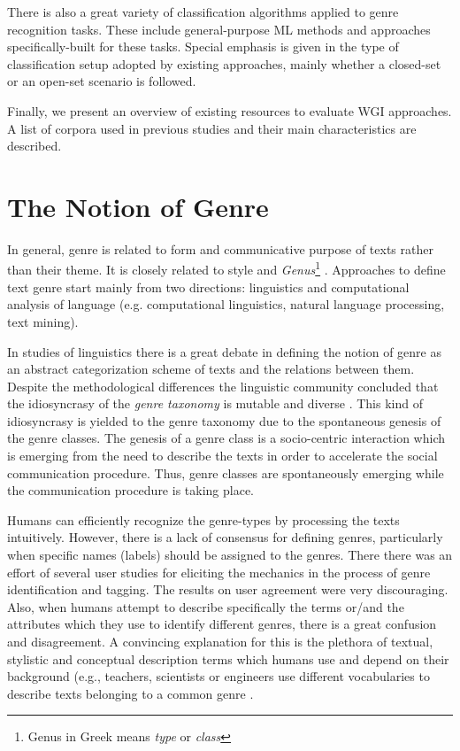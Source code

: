 There is also a great variety of classification algorithms applied to genre recognition tasks. These include general-purpose ML methods and approaches specifically-built for these tasks. Special emphasis is given in the type of classification setup adopted by existing approaches, mainly whether a closed-set or an open-set scenario is followed.

Finally, we present an overview of existing resources to evaluate WGI approaches. A list of corpora used in previous studies and their main characteristics are described. 

\section{The Notion of Genre}
\label{chap:relevant_work:sec:definitions}

In general, genre is related to form and communicative purpose of texts rather than their theme. It is closely related to style and \textit{Genus}\footnote{Genus in Greek means \textit{type} or \textit{class}} \parencite{sugiyanto2014term}. Approaches to define text genre start mainly from two directions: linguistics and computational analysis of language (e.g. computational linguistics, natural language processing, text mining). 

In studies of linguistics there is a great debate in defining the notion of genre as an abstract categorization scheme of texts and the relations between them. Despite the methodological differences the linguistic community concluded that the idiosyncrasy of the \textit{genre taxonomy} is mutable and diverse \parencite{coutinho2009describe}. This kind of idiosyncrasy is yielded to the genre taxonomy due to the spontaneous genesis of the genre classes. The genesis of a genre class is a socio-centric interaction which is emerging from the need to describe the texts in order to accelerate the social communication procedure. Thus, genre classes are spontaneously emerging while the communication procedure is taking place.

Humans can efficiently recognize the genre-types by processing the texts intuitively. However, there is a lack of consensus for defining genres, particularly when specific names (labels) should be assigned to the genres. There there was an effort of several user studies for eliciting the mechanics in the process of genre identification and tagging. The results on user agreement were very discouraging. Also, when humans attempt to describe specifically the terms or/and the attributes which they use to identify different genres, there is a great confusion and disagreement. A convincing explanation for this is the plethora of textual, stylistic and conceptual description terms which humans use and depend on their background (e.g., teachers, scientists or engineers use different vocabularies to describe texts belonging to a common genre \parencite{roussinov2001genre, crowston2011problems}. 


